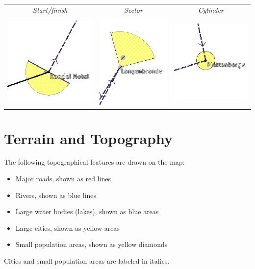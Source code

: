 \begin{center}
\begin{tabular}{c c c}
{\it Start/finish} & {\it Sector} & {\it Cylinder} \\
\includegraphics[angle=0,width=0.3\linewidth,keepaspectratio='true']{figures/cut-startfinish.png} &
\includegraphics[angle=0,width=0.3\linewidth,keepaspectratio='true']{figures/cut-sector.png} &
\includegraphics[angle=0,width=0.3\linewidth,keepaspectratio='true']{figures/cut-barrel.png} \\
\end{tabular}
\end{center}


\section{Terrain and Topography}\label{sec:terrain_topo}

The following topographical features are drawn on the map:
\begin{itemize}
\item Major roads, shown as red lines
\item Rivers, shown as blue lines
\item Large water bodies (lakes), shown as blue areas
\item Large cities, shown as yellow areas
\item Small population areas, shown as yellow diamonds
\end{itemize}
Cities and small population areas are labeled in italics.

